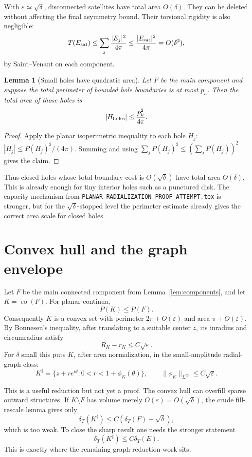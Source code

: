 \documentclass[11pt]{article}
\newtheorem{lemma}[theorem]{Lemma}
\newcommand{\dT}{\delta_T}
\begin{document}
With \(\varepsilon\simeq\sqrt\delta\), disconnected satellites have total area
\(O(\delta)\).  They can be deleted without affecting the final asymmetry
bound.  Their torsional rigidity is also negligible:
\[
   T(E_{\rm sat})\le \sum_j \frac{|E_j|^2}{4\pi}
      \le \frac{|E_{\rm sat}|^2}{4\pi}
      =O(\delta^2),
\]
by Saint--Venant on each component.

\begin{lemma}[Small holes have quadratic area]\label{lem:holes}
Let \(F\) be the main component and suppose the total perimeter of bounded
hole boundaries is at most \(p_h\).  Then the total area of those holes is
\[
   |H_{\rm holes}|\le \frac{p_h^2}{4\pi}.
\]
\end{lemma}

\begin{proof}
Apply the planar isoperimetric inequality to each hole \(H_j\):
\(|H_j|\le P(H_j)^2/(4\pi)\).  Summing and using
\(\sum_j P(H_j)^2\le(\sum_jP(H_j))^2\) gives the claim.
\end{proof}

Thus closed holes whose total boundary cost is \(O(\sqrt\delta)\) have total
area \(O(\delta)\).  This is already enough for tiny interior holes such as a
punctured disk.  The capacity mechanism from
\texttt{PLANAR\_RADIALIZATION\_PROOF\_ATTEMPT.tex} is stronger, but for the
\(\sqrt\delta\)-stopped level the perimeter estimate already gives the correct
area scale for closed holes.

\section{Convex hull and the graph envelope}

Let \(F\) be the main connected component from Lemma~\ref{lem:components}, and
let \(K=\operatorname{co}(F)\).  For planar continua,
\[
   P(K)\le P(F).
   \tag{4.1}
\]
Consequently \(K\) is a convex set with perimeter \(2\pi+O(\varepsilon)\) and
area \(\pi+O(\varepsilon)\).  By Bonnesen's inequality, after translating to a
suitable center \(z\), its inradius and circumradius satisfy
\[
   R_K-r_K\le C\sqrt\varepsilon.
   \tag{4.2}
\]
For \(\delta\) small this puts \(K\), after area normalization, in the
small-amplitude radial-graph class:
\[
   K^\sharp=\{z+r e^{i\theta}:0<r<1+\phi_K(\theta)\},
   \qquad
   \|\phi_K\|_{L^\infty}\le C\sqrt\varepsilon.
   \tag{4.3}
\]

This is a useful reduction but not yet a proof.  The convex hull can overfill
sparse outward structures.  If \(K\setminus F\) has volume merely
\(O(\varepsilon)=O(\sqrt\delta)\), the crude fill-rescale lemma gives only
\[
   \dT(K^\sharp)\le C(\dT(F)+\sqrt\delta),
\]
which is too weak.  To close the sharp result one needs the stronger statement
\[
   \dT(K^\sharp)\le C\dT(E).
   \tag{4.4}
\]
This is exactly where the remaining graph-reduction work sits.
\end{document}
